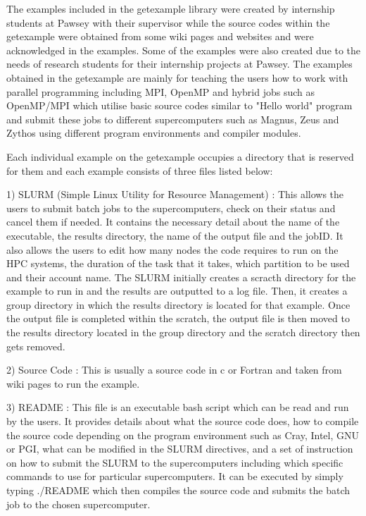 \documentclass[journal]{IEEEtran}
\begin{document}
The examples included in the getexample library were created by internship students at Pawsey with their supervisor while the source codes within the
getexample were obtained from some wiki pages and websites and were acknowledged in the examples. Some of the examples were also created due to the
needs of research students for their internship projects at Pawsey. The examples obtained in the getexample are mainly for teaching the users how to work
with parallel programming including MPI, OpenMP and hybrid jobs such as OpenMP/MPI which utilise basic source codes similar to "Hello world" program and
submit these jobs to different supercomputers such as Magnus, Zeus and Zythos using different program environments and compiler modules. 

Each individual example on the getexample occupies a directory that is reserved for them and each example consists of three files listed below:
    
1) SLURM (Simple Linux Utility for Resource Management) : This allows the users to submit batch jobs to the supercomputers, check on their status and 
cancel them if needed. It contains the necessary detail about the name of the executable, the results directory, the name of the output file and 
the jobID. It also allows the users to edit how many nodes the code requires to run on the HPC systems, the duration of the task that it takes, which 
partition to be used and their account name. The SLURM initially creates a scracth directory for the example to run in and the results are outputted to 
a log file. Then, it creates a group directory in which the results directory is located for that example. Once the output file is completed within the 
scratch, the output file is then moved to the results directory located in the group directory and the scratch directory then gets removed.

2) Source Code : This is usually a source code in c or Fortran and taken from wiki pages to run the example.

3) README : This file is an executable bash script which can be read and run by the users. It provides details about what the source code does,
how to compile the source code depending on the program environment such as Cray, Intel, GNU or PGI, what can be modified in the SLURM directives, and 
a set of instruction on how to submit the SLURM to the supercomputers including which specific commands to use for particular supercomputers. It can be
executed by simply typing ./README which then compiles the source code and submits the batch job to the chosen supercomputer.
\end{document}
